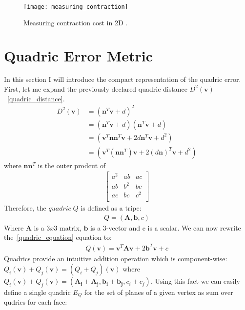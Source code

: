 \begin{figure}[H]
  \begin{center}
    \texttt{[image: measuring\_contraction]}
    \caption{Measuring contraction cost in 2D \cite{garland99}.}
    \label{fig:measuring_contraction_ref}
  \end{center}
\end{figure}

\section{Quadric Error Metric}

In this section I will introduce the compact representation of the quadric error. First, let me expand the previously declared quadric distance $D^2(\mathbf{v})$~\ref{quadric_distance}.
\begin{align}
D^2(\mathbf{v})&=(\mathbf{n}^T\mathbf{v}+d)^2\\
	  &=(\mathbf{n}^T\mathbf{v}+d)(\mathbf{n}^T\mathbf{v}+d)\\
	  &=(\mathbf{v}^T\mathbf{n}\mathbf{n}^T\mathbf{v}+2d\mathbf{n}^T\mathbf{v}+d^2)\\
	  &=(\mathbf{v}^T(\mathbf{n}\mathbf{n}^T)\mathbf{v}+2(d\mathbf{n})^T\mathbf{v}+d^2)
	  \label{quadric_equation}
\end{align}
where $\mathbf{n}\mathbf{n}^T$ is the outer prodcut of
\begin{align}
\left[
\begin{array}{rrrr}
a^2 & ab & ac   \\
ab  & b^2 & bc  \\
ac  & bc  & c^2 \\
\end{array}\right]
\end{align}
Therefore, the $quadric\;Q$ is defined as a tripe:
\begin{align}
Q = (\mathbf{A},\mathbf{b},c)
\end{align}
Where $\mathbf{A}$ is a $3x3$ matrix, $\mathbf{b}$ is a 3-vector and c is a scalar. We can now rewrite the~\ref{quadric_equation} equation to:
\begin{align}
Q(\mathbf{v}) = \mathbf{v}^T\mathbf{A}\mathbf{v} + 2\mathbf{b}^T\mathbf{v} + c
\end{align}
Quadrics provide an intuitive addition operation which is component-wise: $Q_i(\mathbf{v}) + Q_j(\mathbf{v}) = (Q_i + Q_j)(\mathbf{v})$ where $Q_i(\mathbf{v}) + Q_j(\mathbf{v}) = (\mathbf{A_i} + \mathbf{A_j}, \mathbf{b_i} + \mathbf{b_j}, c_i + c_j)$. Using this fact we can easily define a single quadric $E_Q$ for the set of planes of a given vertex \cite{garland99} as sum over qudrics for each face:
